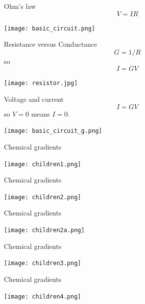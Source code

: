 \documentclass{beamer}
\newcommand{\crish}{\color{reddish}}
\newcommand{\cbla}{\color{black}}
\begin{document}
\begin{frame}{Ohm's law}
\crish
$$V=IR$$
\cbla
\begin{center}
    \texttt{[image: basic\_circuit.png]}
\end{center}
\end{frame}


\begin{frame}{Resistance versus Conductance}
\crish
$$G=1/R$$
\cbla{}so\crish
$$I=GV$$
\cbla
\begin{center}
    \texttt{[image: resistor.jpg]}
\end{center}
\end{frame}


\begin{frame}{Voltage and current}
\crish
$$I=GV$$
\cbla{}so\crish{} $V=0$\cbla{} means \crish{} $I=0$\cbla{}.
\begin{center}
    \texttt{[image: basic\_circuit\_g.png]}
\end{center}
\end{frame}

\begin{frame}{Chemical gradients}
\begin{center}
    \texttt{[image: children1.png]}
\end{center}
\end{frame}

\begin{frame}{Chemical gradients}
\begin{center}
    \texttt{[image: children2.png]}
\end{center}
\end{frame}


\begin{frame}{Chemical gradients}
\begin{center}
    \texttt{[image: children2a.png]}
\end{center}
\end{frame}


\begin{frame}{Chemical gradients}
\begin{center}
    \texttt{[image: children3.png]}
\end{center}
\end{frame}

\begin{frame}{Chemical gradients}
\begin{center}
    \texttt{[image: children4.png]}
\end{center}
\end{frame}
\end{document}
